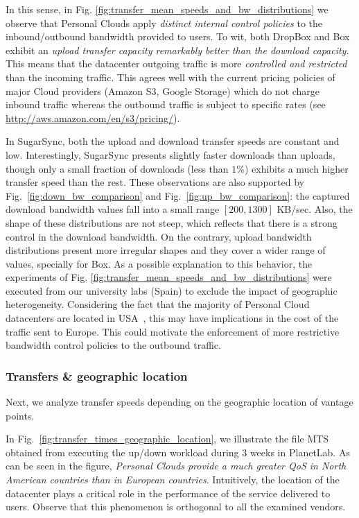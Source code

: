 In this sense, in Fig. \ref{fig:transfer_mean_speeds_and_bw_distributions} we observe  
that Personal Clouds apply \textit{distinct internal control policies}
to the inbound/outbound bandwidth provided to users. To wit,
both DropBox and Box exhibit an \textit{upload transfer capacity remarkably better
than the download capacity}. This means that the datacenter outgoing
traffic is more \textit{controlled and restricted} than the incoming traffic. This agrees
well with the current pricing policies of major Cloud providers (Amazon S3,
Google Storage) which do not charge inbound traffic whereas
the outbound traffic is subject to specific rates (see \url{http://aws.amazon.com/en/s3/pricing/}). 

In SugarSync, both the upload and download transfer speeds are constant and
low. Interestingly, SugarSync presents slightly faster downloads than uploads,
though only a small fraction of downloads (less than $1\%$) exhibits a much
higher transfer speed than the rest. These observations are also supported by Fig.~\ref{fig:down_bw_comparison} and Fig.~\ref{fig:up_bw_comparison}: the captured download
bandwidth values fall into a small range $[200, 1300]$ KB/sec. Also,
the shape of these distributions are not steep, which reflects that there is
a strong control in the download bandwidth.
On the contrary, upload bandwidth distributions present more irregular shapes and
they cover a wider range of values, specially for Box.
As a possible explanation to this behavior, the experiments of Fig. \ref{fig:transfer_mean_speeds_and_bw_distributions} 
were executed from our university labs (Spain) to exclude the impact of geographic heterogeneity. 
Considering the fact that the majority of 
Personal Cloud datacenters are located in USA~\cite{drago2013benchmarking}, 
this may have implications in the cost of the traffic sent to Europe. This could motivate
the enforcement of more restrictive bandwidth control policies to
the outbound traffic.
\medskip

\subsubsection*{Transfers \& geographic location} 
Next, we analyze transfer speeds depending
on the geographic location of vantage points. 

In Fig.~\ref{fig:transfer_times_geographic_location},
we illustrate the file MTS obtained from executing the up/down 
workload during $3$ weeks in PlanetLab. 
As can be seen in the figure, \textit{Personal Clouds provide a
much greater QoS in North American countries than in European countries}.
Intuitively, the location of the datacenter plays
a critical role in the performance of the service delivered to users. 
Observe that this phenomenon is orthogonal to all the examined vendors.

